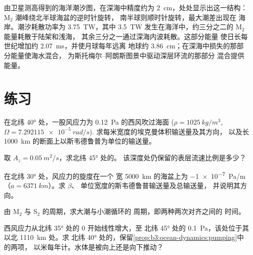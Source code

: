 由卫星测高得到的海洋潮汐图，在深海中精度约为
\qty{2}{cm}，处处显示出这一结构：M$_2$
潮峰绕北半球海盆的逆时针旋转，
南半球则顺时针旋转，最大潮差出现在
海岸。潮汐耗散功率为 \qty{3.75}{TW}，其中 \qty{3.5}{TW}
发生在海洋中，约三分之二的 M$_2$ 能量耗散于陆架和浅海，
其余三分之一通过深海内波耗散。这部分能量
使日长每世纪增加约 \qty{2.07}{ms}，并使月球每年远离
地球约 \qty{3.86}{cm}；在深海中损失的那部分能量使海水混合，
为斯托梅尔–阿朗斯图景中驱动深层环流的那部分
混合提供能量。


\section{练习}

\begin{exercise}[$\star$]\label{exo:b3:ocean-dynamics:1}
在北纬 \ang{40} 处，一股风应力为 \qty{0.12}{Pa} 的西风吹过海面
($\rho = \qty{1025}{kg/m^3}$, $\Omega = \qty{7.292115e-5}{rad/s}$).
求每米宽度的埃克曼体积输送量及其方向，
以及长 \qty{1000}{km} 的断面上以斯韦德鲁普为单位的输送量。
\end{exercise}

\begin{exercise}[$\star$]\label{exo:b3:ocean-dynamics:2}
取 $A_z = \qty{0.05}{m^2/s}$，求北纬 \ang{45} 处的。
该深度处仍保留的表层流速比例是多少？
\end{exercise}

\begin{exercise}[$\star$]\label{exo:b3:ocean-dynamics:3}
在北纬 \ang{30} 处，风应力的旋度在一个
宽 \qty{5000}{km} 的海盆上为 \qty{-1e-7}{Pa/m}（$a = \qty{6371}{km}$）。求 $\beta$、
单位宽度的斯韦德鲁普输送量及总输送量，
并说明其方向。
\end{exercise}

\begin{exercise}[$\star$]\label{exo:b3:ocean-dynamics:4}
由 M$_2$ 与 S$_2$ 的周期，求大潮与小潮循环的
周期，即两种两次对齐之间的
时间。
\end{exercise}

\begin{exercise}[$\star\star$]\label{exo:b3:ocean-dynamics:5}
西风应力从北纬 \ang{35} 处的 0 开始线性增大，至
北纬 \ang{45} 处的 \qty{0.1}{Pa}，该处位于其以北 \qty{1110}{km} 处。求
北纬 \ang{40} 处的，保留\cref{prop:b3:ocean-dynamics:pumping}中的两项，
以米每年计。水体是被向上还是向下推动？
\end{exercise}

